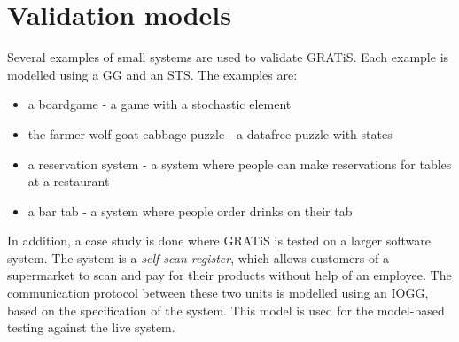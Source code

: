 \section{Validation models}\label{sec:model-examples}

Several examples of small systems are used to validate GRATiS. Each example is modelled using a GG and an STS. The examples are:
\begin{itemize}
\item a boardgame - a game with a stochastic element
\item the farmer-wolf-goat-cabbage puzzle - a datafree puzzle with states
\item a reservation system - a system where people can make reservations for tables at a restaurant
\item a bar tab - a system where people order drinks on their tab
\end{itemize}

In addition, a case study is done where GRATiS is tested on a larger software system. The system is a \textit{self-scan register}, which allows customers of a supermarket to scan and pay for their products without help of an employee. The communication protocol between these two units is modelled using an IOGG, based on the specification of the system. This model is used for the model-based testing against the live system.

